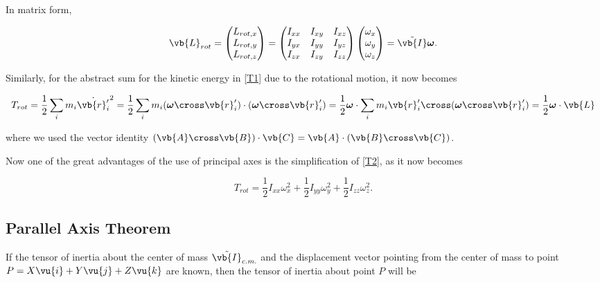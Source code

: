 \documentclass[a4paper,12pt]{report}
\begin{document}
In matrix form, 

\begin{equation}
	\vb{L}_{rot}  = 
	\begin{pmatrix}
	L_{rot,x} \\
	L_{rot,y} \\
	L_{rot,z} 
	\end{pmatrix}
	= \begin{pmatrix}
	I_{xx}  & I_{xy}  & I_{xz} \\
	I_{yx}  & I_{yy}  & I_{yz} \\
	I_{zx}  & I_{zy}  & I_{zz} 
	\end{pmatrix}
	\begin{pmatrix}
	\omega _{x} \\
	\omega _{y} \\
	\omega _{z} 
	\end{pmatrix}
	=\tilde{\vb{I} } \boldsymbol{\omega } .		
\end{equation}

Similarly, for the abstract sum for the kinetic energy in \cref{T1} due to the rotational motion, it now becomes

\begin{equation}
	T_{rot} = \frac{1}{2} \sum_{i}^{} m_{i} \dot{\vb{r} '_{i} } ^2 = \frac{1}{2} \sum_{i}^{} m_{i} (\boldsymbol{\omega } \cross \vb{r} '_{i} ) \cdot (\boldsymbol{\omega } \cross \vb{r} '_{i} ) = \frac{1}{2} \boldsymbol{\omega } \cdot \sum_{i}^{} m_{i} \vb{r} '_{i} \cross (\boldsymbol{\omega } \cross \vb{r} '_{i} ) = \frac{1}{2} \boldsymbol{\omega }  \cdot \vb{L}  \label{T2} 
\end{equation}

where we used the vector identity \((\vb{A} \cross \vb{B} )\cdot \vb{C} = \vb{A} \cdot (\vb{B} \cross \vb{C} )\). 

Now one of the great advantages of the use of principal axes is the simplification of \cref{T2}, as it now becomes  

\begin{equation}
	T_{rot} = \frac{1}{2} I_{xx} \omega _{x} ^2 + \frac{1}{2} I_{yy} \omega _{y} ^2 + \frac{1}{2} I_{zz} \omega _{z} ^2.  
\end{equation}

\subsection{Parallel Axis Theorem}

If the tensor of inertia about the center of mass \(\tilde{\vb{I} } _{c.m. } \) and the displacement vector pointing from the center of mass to point \(P = X \vu{i} + Y \vu{j} + Z\vu{k} \) are known, then the tensor of inertia about point \(P\) will be 
\end{document}
